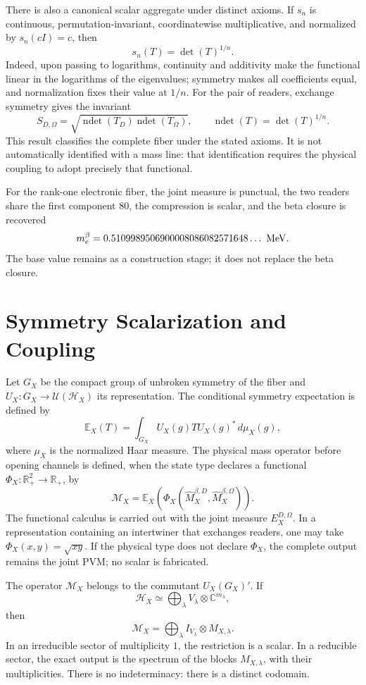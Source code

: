 There is also a canonical scalar aggregate under distinct axioms. If
\(s_n\) is continuous, permutation-invariant, coordinatewise
multiplicative, and normalized by \(s_n(cI)=c\), then
\[
 s_n(T)=\det(T)^{1/n}.
\]
Indeed, upon passing to logarithms, continuity and additivity make the
functional linear in the logarithms of the eigenvalues; symmetry makes all
coefficients equal, and normalization fixes their value at \(1/n\). For the pair of
readers, exchange symmetry gives the invariant
\[
 S_{D,\Omega}
 =\sqrt{
 \operatorname{ndet}(T_D)\operatorname{ndet}(T_\Omega)},
 \qquad
 \operatorname{ndet}(T)=\det(T)^{1/n}.
\]
This result classifies the complete fiber under the stated axioms. It is not
automatically identified with a mass line: that identification requires
the physical coupling to adopt precisely that functional.

For the rank-one electronic fiber, the joint measure is punctual, the two
readers share the first component \(80\), the compression is scalar, and the beta closure is
recovered
\[
 m_e^\beta
 =0.5109989506900008086082571648\ldots\ {\rm MeV}.
\]
The base value remains as a construction stage; it does not replace the beta closure.

\section{Symmetry Scalarization and Coupling}

Let \(G_X\) be the compact group of unbroken symmetry of the fiber and
\(U_X:G_X\to\mathcal U(\mathcal H_X)\) its representation. The conditional
symmetry expectation is defined by
\[
 \mathbb E_X(T)
 =\int_{G_X}U_X(g)TU_X(g)^*\,d\mu_X(g),
\]
where \(\mu_X\) is the normalized Haar measure. The physical mass operator
before opening channels is defined, when the state type declares a
functional \(\Phi_X:\mathbb R_+^2\to\mathbb R_+\), by
\[
 \mathcal M_X
 =\mathbb E_X\!\left(
   \Phi_X(\widehat M_X^{\beta,D},\widehat M_X^{\beta,\Omega})
  \right).
\]
The functional calculus is carried out with the joint measure
\(E_X^{D,\Omega}\). In a representation containing an intertwiner that
exchanges readers, one may take \(\Phi_X(x,y)=\sqrt{xy}\). If the physical
type does not declare \(\Phi_X\), the complete output remains the joint PVM;
no scalar is fabricated.

\begin{theorem}
The operator \(\mathcal M_X\) belongs to the commutant
\(U_X(G_X)'\). If
\[
 \mathcal H_X\simeq
 \bigoplus_\lambda V_\lambda\otimes\mathbb C^{m_\lambda},
\]
then
\[
 \mathcal M_X=
 \bigoplus_\lambda I_{V_\lambda}\otimes M_{X,\lambda}.
\]
In an irreducible sector of multiplicity \(1\), the restriction is a scalar.
In a reducible sector, the exact output is the spectrum of the blocks
\(M_{X,\lambda}\), with their multiplicities. There is no indeterminacy:
there is a distinct codomain.
\end{theorem}

